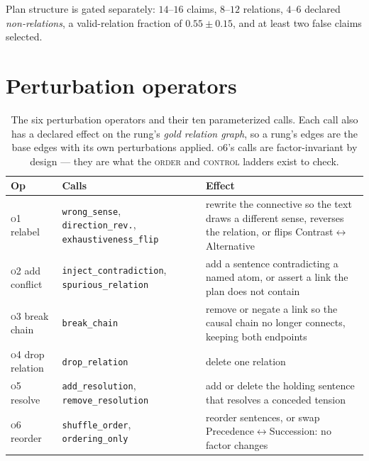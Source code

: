 \documentclass{article} %
\newcommand{\sense}[1]{\textsf{#1}}             %
\begin{document}
Plan structure is gated separately: $14$--$16$ claims, $8$--$12$ relations, $4$--$6$
declared \emph{non-relations}, a valid-relation fraction of $0.55\pm0.15$, and at least two
false claims selected.

\section{Perturbation operators}
\label{app-operators}

\begin{table}[t]
\centering\small
\caption{The six perturbation operators and their ten parameterized calls. Each call also
  has a declared effect on the rung's \emph{gold relation graph}, so a rung's edges are the
  base edges with its own perturbations applied. \textsc{o6}'s calls are factor-invariant by
  design --- they are what the \textsc{order} and \textsc{control} ladders exist to check.}
\label{tab:operators}
\begin{tabular}{@{}lp{3.5cm}p{7.2cm}@{}}
\toprule
Op & Calls & Effect \\
\midrule
\textsc{o1} relabel & \texttt{wrong\_sense}, \texttt{direction\_rev.}, \texttt{exhaustive\-ness\_flip}
                         & rewrite the connective so the text draws a different sense,
                           reverses the relation, or flips
                           \sense{Contrast}$\leftrightarrow$\sense{Alternative} \\
\textsc{o2} add conflict & \texttt{inject\_contradiction}, \texttt{spurious\_relation}
                         & add a sentence contradicting a named atom, or assert a link the
                           plan does not contain \\
\textsc{o3} break chain  & \texttt{break\_chain}
                         & remove or negate a link so the causal chain no longer connects,
                           keeping both endpoints \\
\textsc{o4} drop relation& \texttt{drop\_relation} & delete one relation \\
\textsc{o5} resolve      & \texttt{add\_resolution}, \texttt{remove\_resolution}
                         & add or delete the holding sentence that resolves a conceded
                           tension \\
\textsc{o6} reorder      & \texttt{shuffle\_order}, \texttt{ordering\_only}
                         & reorder sentences, or swap
                           \sense{Precedence}$\leftrightarrow$\sense{Succession}: no factor
                           changes \\
\bottomrule
\end{tabular}
\end{table}
\end{document}
